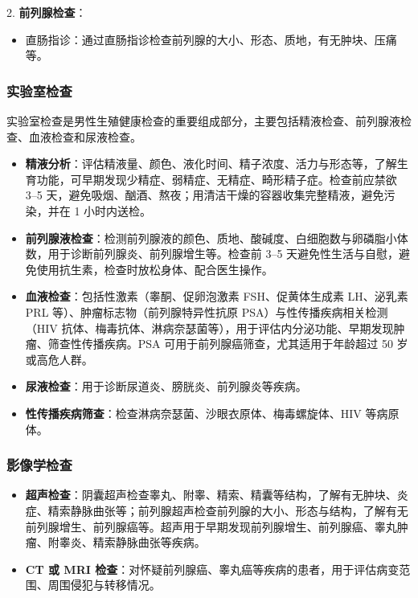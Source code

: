 \documentclass[12pt,a4paper,twoside]{ctexbook}
\begin{document}
2. \textbf{前列腺检查}：
  \begin{itemize}
  \item 直肠指诊：通过直肠指诊检查前列腺的大小、形态、质地，有无肿块、压痛等。
  \end{itemize}

\subsubsection{实验室检查}

实验室检查是男性生殖健康检查的重要组成部分，主要包括精液检查、前列腺液检查、血液检查和尿液检查。

\begin{itemize}
\item \textbf{精液分析}：评估精液量、颜色、液化时间、精子浓度、活力与形态等，了解生育功能，可早期发现少精症、弱精症、无精症、畸形精子症。检查前应禁欲 3--5 天，避免吸烟、酗酒、熬夜；用清洁干燥的容器收集完整精液，避免污染，并在 1 小时内送检。
\item \textbf{前列腺液检查}：检测前列腺液的颜色、质地、酸碱度、白细胞数与卵磷脂小体数，用于诊断前列腺炎、前列腺增生等。检查前 3--5 天避免性生活与自慰，避免使用抗生素，检查时放松身体、配合医生操作。
\item \textbf{血液检查}：包括性激素（睾酮、促卵泡激素 FSH、促黄体生成素 LH、泌乳素 PRL 等）、肿瘤标志物（前列腺特异性抗原 PSA）与性传播疾病相关检测（HIV 抗体、梅毒抗体、淋病奈瑟菌等），用于评估内分泌功能、早期发现肿瘤、筛查性传播疾病。PSA 可用于前列腺癌筛查，尤其适用于年龄超过 50 岁或高危人群。
\item \textbf{尿液检查}：用于诊断尿道炎、膀胱炎、前列腺炎等疾病。
\item \textbf{性传播疾病筛查}：检查淋病奈瑟菌、沙眼衣原体、梅毒螺旋体、HIV 等病原体。
\end{itemize}

\subsubsection{影像学检查}

\begin{itemize}
\item \textbf{超声检查}：阴囊超声检查睾丸、附睾、精索、精囊等结构，了解有无肿块、炎症、精索静脉曲张等；前列腺超声检查前列腺的大小、形态与结构，了解有无前列腺增生、前列腺癌等。超声用于早期发现前列腺增生、前列腺癌、睾丸肿瘤、附睾炎、精索静脉曲张等疾病。
\item \textbf{CT 或 MRI 检查}：对怀疑前列腺癌、睾丸癌等疾病的患者，用于评估病变范围、周围侵犯与转移情况。
\end{itemize}
\end{document}
